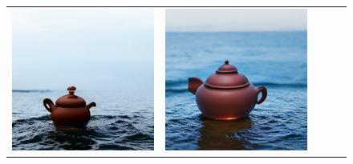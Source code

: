 \begin{figure}[!ht]
\begin{tabular}[t]{c c c c c}
    \includegraphics[width=\xwidth]{cp2/figures/dreambooth/teapot/c160_checkpoint_399.png} &
    \includegraphics[width=\xwidth]{cp2/figures/dreambooth/teapot/c192_checkpoint_999.png} \\

\end{tabular}
\end{figure}
